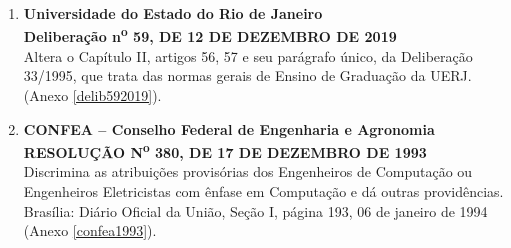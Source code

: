 \begin{enumerate}
      \item \textbf{Universidade do Estado do Rio de Janeiro}  \\
            \textbf{Deliberação n\textsuperscript{o} 59, DE 12 DE DEZEMBRO DE 2019}  \\
            Altera o Capítulo II, artigos 56, 57 e seu parágrafo único, da Deliberação 33/1995, que trata das normas gerais de Ensino de Graduação da UERJ. (Anexo \ref{delib592019}).

      \item \textbf{CONFEA – Conselho Federal de Engenharia e Agronomia} \\
            \textbf{RESOLUÇÃO N\textsuperscript{o} 380, DE 17 DE DEZEMBRO DE 1993}  \\
            Discrimina as atribuições provisórias dos Engenheiros de Computação ou Engenheiros Eletricistas com ênfase em Computação e dá outras providências. Brasília: Diário Oficial da União, Seção I, página 193, 06 de janeiro de 1994 (Anexo \ref{confea1993}).
\end{enumerate}
